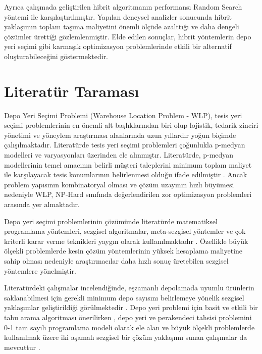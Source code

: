 \documentclass[conference]{IEEEtran}
\begin{document}
Ayrıca çalışmada geliştirilen hibrit algoritmanın performansı Random Search yöntemi ile karşılaştırılmıştır. Yapılan deneysel analizler sonucunda hibrit yaklaşımın toplam taşıma maliyetini önemli ölçüde azalttığı ve daha dengeli çözümler ürettiği gözlemlenmiştir. Elde edilen sonuçlar, hibrit yöntemlerin depo yeri seçimi gibi karmaşık optimizasyon problemlerinde etkili bir alternatif oluşturabileceğini göstermektedir.

\section{Literatür Taraması}

Depo Yeri Seçimi Problemi (Warehouse Location Problem - WLP), tesis yeri seçimi problemlerinin en önemli alt başlıklarından biri olup lojistik, tedarik zinciri yönetimi ve yöneylem araştırması alanlarında uzun yıllardır yoğun biçimde çalışılmaktadır. Literatürde tesis yeri seçimi problemleri çoğunlukla p-medyan modelleri ve varyasyonları üzerinden ele alınmıştır. Literatürde, p-medyan modellerinin temel amacının belirli müşteri taleplerini minimum toplam maliyet ile karşılayacak tesis konumlarının belirlenmesi olduğu ifade edilmiştir \cite{karagul2014pmedyan}. Ancak problem yapısının kombinatoryal olması ve çözüm uzayının hızlı büyümesi nedeniyle WLP, NP-Hard sınıfında değerlendirilen zor optimizasyon problemleri arasında yer almaktadır.
 
Depo yeri seçimi problemlerinin çözümünde literatürde matematiksel programlama yöntemleri, sezgisel algoritmalar, meta-sezgisel yöntemler ve çok kriterli karar verme teknikleri yaygın olarak kullanılmaktadır \cite{sagnak2020depo}. Özellikle büyük ölçekli problemlerde kesin çözüm yöntemlerinin yüksek hesaplama maliyetine sahip olması nedeniyle araştırmacılar daha hızlı sonuç üretebilen sezgisel yöntemlere yönelmiştir.
 
Literatürdeki çalışmalar incelendiğinde, eşzamanlı depolamada uyumlu ürünlerin saklanabilmesi için gerekli minimum depo sayısını belirlemeye yönelik sezgisel yaklaşımlar geliştirildiği görülmektedir \cite{kalfakakou2003minimum}. Depo yeri problemi için basit ve etkili bir tabu arama algoritması önerilirken \cite{michel2004simple}, depo yeri ve perakendeci tahsisi problemini 0-1 tam sayılı programlama modeli olarak ele alan ve büyük ölçekli problemlerde kullanılmak üzere iki aşamalı sezgisel bir çözüm yaklaşımı sunan çalışmalar da mevcuttur \cite{gill2007optimal}.
 
\end{document}
